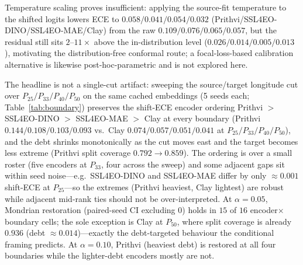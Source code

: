 \documentclass[journal]{IEEEtran}
\renewcommand{\_}{\textunderscore\allowbreak}
\begin{document}
Temperature scaling \citep{guo2017calibration} proves insufficient: applying the source-fit temperature to the shifted logits
lowers ECE to $0.058/0.041/0.054/0.032$ (Prithvi/SSL4EO-DINO/SSL4EO-MAE/Clay) from the raw
$0.109/0.076/0.065/0.057$, but the residual still sits $2$--$11\times$ above the in-distribution level
($0.026/0.014/0.005/0.013$), motivating the distribution-free conformal route; a focal-loss-based
calibration alternative \citep{mukhoti2020calibrating} is likewise post-hoc-parametric and is not explored here.

The headline is not a single-cut artifact: sweeping the source/target
longitude cut over $P_{25}/P_{33}/P_{40}/P_{50}$ on the same cached embeddings (5 seeds each;
Table~\ref{tab:boundary}) preserves the shift-ECE encoder ordering Prithvi $>$ SSL4EO-DINO $>$ SSL4EO-MAE
$>$ Clay at every boundary (Prithvi $0.144/0.108/0.103/0.093$ vs.\ Clay $0.074/0.057/0.051/0.041$ at
$P_{25}/P_{33}/P_{40}/P_{50}$), and the debt shrinks monotonically as the cut moves east and the target
becomes less extreme (Prithvi split coverage $0.792\to0.859$). The ordering is over a small roster (five
encoders at $P_{33}$, four across the sweep) and some adjacent gaps sit within seed noise---e.g.\ SSL4EO-DINO
and SSL4EO-MAE differ by only ${\approx}0.001$ shift-ECE at $P_{25}$---so the extremes (Prithvi heaviest, Clay
lightest) are robust while adjacent mid-rank ties should not be over-interpreted. At $\alpha=0.05$, Mondrian restoration
(paired-seed CI excluding $0$) holds in $15$ of $16$ encoder$\times$boundary cells; the sole exception is
Clay at $P_{50}$, where split coverage is already $0.936$ (debt ${\approx}0.014$)---exactly the
debt-targeted behaviour the conditional framing predicts. At $\alpha=0.10$, Prithvi (heaviest debt) is
restored at all four boundaries while the lighter-debt encoders mostly are not.
\end{document}
